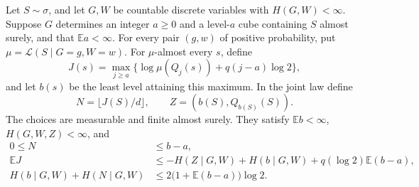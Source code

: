 \begin{lemma}
\label{l:grid:refinement}
Let $S\sim\sigma$, and let $G,W$ be countable discrete variables with
$H(G,W)<\infty$.  Suppose $G$ determines an integer $a\ge0$ and a
level-$a$ cube containing $S$ almost surely, and that $\mathbb E a<\infty$.
For every pair $(g,w)$ of positive probability, put
$\mu=\mathcal L(S\mid G=g,W=w)$.  For $\mu$-almost every $s$, define
\[
 J(s)=\max_{j\ge a}
 \bigl\{\log\mu(Q_j(s))+q(j-a)\log2\bigr\},
\]
and let $b(s)$ be the least level attaining this maximum.  In the joint
law define
\[
 N=\lfloor J(S)/d\rfloor,\qquad Z=(b(S),Q_{b(S)}(S)).
\]
The choices are measurable and finite almost surely.  They satisfy
$\mathbb E b<\infty$, $H(G,W,Z)<\infty$, and
\begin{align}
 0\le N&\le b-a,\label{l:grid:level-bound}\\
 \mathbb E J
 &\le-H(Z\mid G,W)+H(b\mid G,W)
       +q(\log2)\mathbb E(b-a),\label{l:grid:label-charge}\\
 H(b\mid G,W)+H(N\mid G,W)
 &\le2\bigl(1+\mathbb E(b-a)\bigr)\log2.
 \label{l:grid:level-entropies}
\end{align}
\end{lemma}

